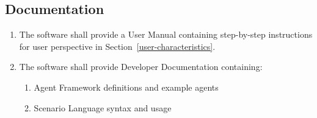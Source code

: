 \documentclass[titlepage]{article}
\begin{document}
\subsection{Documentation%
  \label{documentation}%
}
\begin{enumerate}
    \item The software shall provide a User Manual containing step-by-step instructions for user perspective in Section~\ref{user-characteristics}.
    \item The software shall provide Developer Documentation containing:
    \begin{enumerate}
        \item Agent Framework definitions and example agents
        \item Scenario Language syntax and usage
    \end{enumerate}
\end{enumerate}


\appendix
\pagebreak
\end{document}
